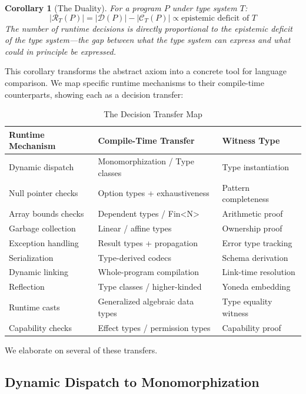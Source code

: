 \documentclass[11pt]{article}
\newtheorem{corollary}[theorem]{Corollary}
\newcommand{\DP}{\mathcal{D}(P)}
\begin{document}
\begin{corollary}[The Duality]
\label{cor:duality}
For a program $P$ under type system $T$:
\[
  |\mathcal{R}_T(P)| = |\DP| - |\mathcal{C}_T(P)| \propto \text{epistemic deficit of } T
\]
The number of runtime decisions is directly proportional to the \emph{epistemic deficit}
of the type system---the gap between what the type system \emph{can} express and what
\emph{could} in principle be expressed.
\end{corollary}

This corollary transforms the abstract axiom into a concrete tool for language
comparison. We map specific runtime mechanisms to their compile-time counterparts,
showing each as a decision transfer:

\begin{table}[h]
\centering
\caption{The Decision Transfer Map}
\label{tab:transfer-map}
\begin{tabular}{@{}lll@{}}
\toprule
\textbf{Runtime Mechanism} & \textbf{Compile-Time Transfer} & \textbf{Witness Type} \\
\midrule
Dynamic dispatch      & Monomorphization / Type classes  & Type instantiation \\
Null pointer checks   & Option types + exhaustiveness    & Pattern completeness \\
Array bounds checks   & Dependent types / Fin<N>         & Arithmetic proof \\
Garbage collection    & Linear / affine types            & Ownership proof \\
Exception handling    & Result types + propagation       & Error type tracking \\
Serialization         & Type-derived codecs              & Schema derivation \\
Dynamic linking       & Whole-program compilation        & Link-time resolution \\
Reflection            & Type classes / higher-kinded     & Yoneda embedding \\
Runtime casts         & Generalized algebraic data types & Type equality witness \\
Capability checks     & Effect types / permission types  & Capability proof \\
\bottomrule
\end{tabular}
\end{table}

We elaborate on several of these transfers.

\subsection{Dynamic Dispatch to Monomorphization}
\end{document}
